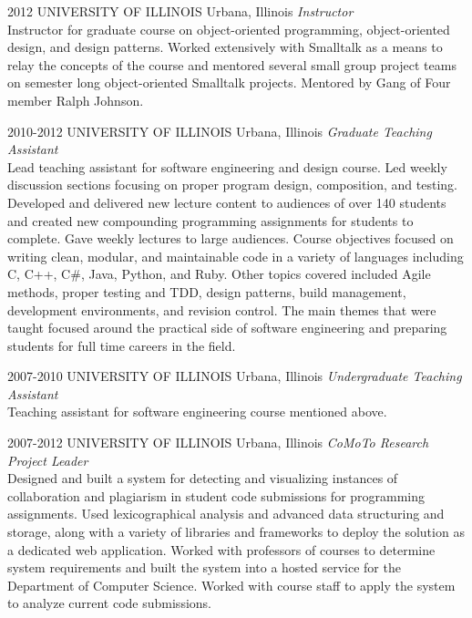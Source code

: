 \documentclass['print']{friggeri-cv} %
\begin{document}
\begin{entrylist}
\entry
{2012}
{UNIVERSITY OF ILLINOIS}
{Urbana, Illinois}
{\emph{Instructor} \\
Instructor for graduate course on object-oriented programming, object-oriented design, and design patterns. Worked
extensively with Smalltalk as a means to relay the concepts of the course and mentored several small group project
teams on semester long object-oriented Smalltalk projects. Mentored by Gang of Four member Ralph Johnson.}
\end{entrylist}
\begin{entrylist}
\entry
{2010-2012}
{UNIVERSITY OF ILLINOIS}
{Urbana, Illinois}
{\emph{Graduate Teaching Assistant} \\
Lead teaching assistant for software engineering and design course. Led weekly discussion sections focusing on proper program design, composition, and testing. Developed and delivered new lecture content to audiences of over 140 students and created new compounding programming assignments for students to complete. Gave weekly lectures to large audiences. Course objectives focused on writing clean, modular, and maintainable code in a variety of languages including C, C++, C\#, Java, Python, and Ruby. Other topics covered included Agile methods, proper testing and TDD, design patterns, build management, development environments, and revision control. The main themes that were taught focused around the practical side of software engineering and preparing students for full time careers in the field.}
\end{entrylist}
\begin{entrylist}
\entry
{2007-2010}
{UNIVERSITY OF ILLINOIS}
{Urbana, Illinois}
{\emph{Undergraduate Teaching Assistant} \\
Teaching assistant for software engineering course mentioned above.}
\end{entrylist}
\begin{entrylist}
\entry
{2007-2012}
{UNIVERSITY OF ILLINOIS}
{Urbana, Illinois}
{\emph{CoMoTo Research Project Leader} \\
Designed and built a system for detecting and visualizing instances of collaboration and plagiarism in student code
submissions for programming assignments. Used lexicographical analysis and advanced data structuring and storage,
along with a variety of libraries and frameworks to deploy the solution as a dedicated web application. Worked with
professors of courses to determine system requirements and built the system into a hosted service for the Department of
Computer Science. Worked with course staff to apply the system to analyze current code submissions.}
\end{entrylist}
\end{document}
